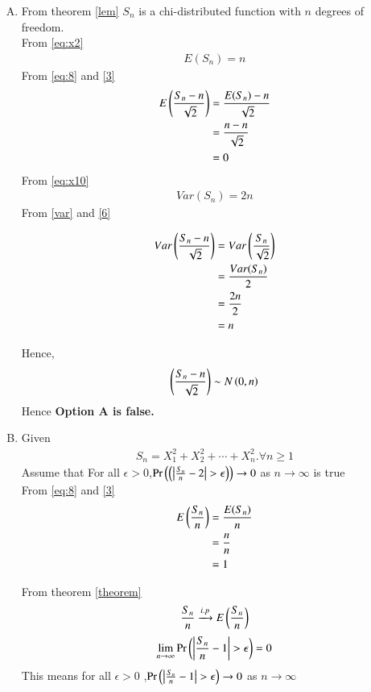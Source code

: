 \documentclass[journal,12pt,twocolumn]{IEEEtran}
\begin{document}
 \begin{enumerate}[(A)]
\item
From theorem \eqref{lem} $S_n$ is a chi-distributed function with $n$ degrees of freedom.\\
From \eqref{eq:x2} 
\begin{align}
    E(S_n)=n \label{eq:8}
\end{align}
From \eqref{eq:8} and \eqref{3}
\begin{align}
    E\left(\frac{S_{n}-n}{\sqrt{2}}\right)&=\frac{E(S_n)-n}{\sqrt{2}}\\
     &=\frac{n-n}{\sqrt{2}}\\
    &=0
\end{align}
From \eqref{eq:x10}
\begin{align}
    Var(S_n)= 2n\label{var}
\end{align}
From \eqref{var} and \eqref{6}

\begin{align}
    Var\left(\frac{S_{n}-n}{\sqrt{2}}\right)
    &= Var\left(\frac{S_n}{\sqrt{2}}\right)\\
    &=\frac{Var(S_n)}{2}\\
    &=\frac{2n}{2}\\
    &=n
\end{align}

Hence,
\begin{align}
    \left(\frac{S_{n}-n}{\sqrt{2}}\right)\sim N\left(0,n\right)
\end{align}
Hence \textbf{Option A is false.}



\item Given 
\begin{align}
    S_{n}=X_{1}^2+X_{2}^2+\cdots+X_{n}^2.\forall n\geq 1
\end{align}
Assume that For all $\epsilon > 0$,$\pr{\brak{\left|{\frac{S_n}{n}-2}\right|>\epsilon}}\to 0$ as $n \to \infty$ is true
\\From \eqref{eq:8} and \eqref{3}
\begin{align}
    E\left(\frac{S_n}{n}\right)&=\frac{E(S_n)}{n}\\
        &=\frac{n}{n}\\
        &=1\label{25}
\end{align}

From theorem \eqref{theorem}
\begin{align}
    \frac{S_n}{n} \xrightarrow{i.p}  E\left(\frac{S_n}{n}\right)
\end{align}
\begin{align}
    \lim_{n \to \infty} \pr{\left|{\frac{S_n}{n}-1}\right|>\epsilon}=0
\end{align}
This means for all $\epsilon>0$ ,$\pr{\left|{\frac{S_n}{n}-1}\right|>\epsilon}\to 0$ as $n \to \infty$


\end{enumerate}
\end{document}
